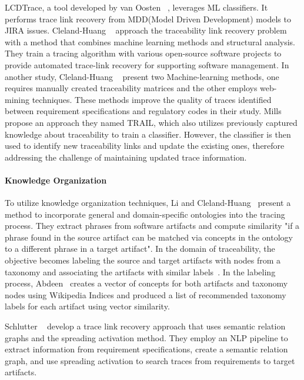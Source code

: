 LCDTrace, a tool developed by van Oosten \etal{}~\cite{VANOOSTEN2023107226}, leverages ML classifiers. It performs trace link recovery from MDD(Model Driven Development) models to JIRA issues.
Cleland-Huang \etal{}~\cite{jane-2012} approach the traceability link recovery problem with a method that combines machine learning methods and structural analysis. They train a tracing algorithm with various open-source software projects to provide automated trace-link recovery for supporting software management.
In another study, Cleland-Huang \etal{}~\cite{cleland-2010} present two Machine-learning methods, one requires manually created traceability matrices and the other employs web-mining techniques. These methods improve the quality of traces identified between requirement specifications and regulatory codes in their study.
Mills \etal{}~\cite{mills-2018} propose an approach they named TRAIL, which also utilizes previously captured knowledge about traceability to train a classifier. However, the classifier is then used to identify new traceability links and update the existing ones, therefore addressing the challenge of maintaining updated trace information.

\paragraph{Knowledge Organization} To utilize knowledge organization techniques, Li and Cleland-Huang~\cite{Ontology} present a method to incorporate general and domain-specific ontologies into the tracing process. They extract phrases from software artifacts and compute similarity "if a phrase found in the source artifact can be matched via concepts in the ontology to a different phrase in a target
artifact". 
In the domain of traceability, the objective becomes labeling the source and target artifacts with nodes from a taxonomy and associating the artifacts with similar labels~\cite{Taxonomy}. In the labeling process, Abdeen~\cite{abdeen-2023} creates a vector of concepts for both artifacts and taxonomy nodes using Wikipedia Indices and produced a list of recommended taxonomy labels for each artifact using vector similarity.

 Schlutter \etal{}~\cite{Spreading-Activation} develop a trace link recovery approach that uses semantic relation graphs and the spreading activation method. They employ an NLP pipeline to extract information from requirement specifications, create a semantic relation graph, and use spreading activation to search traces from requirements to target artifacts.

